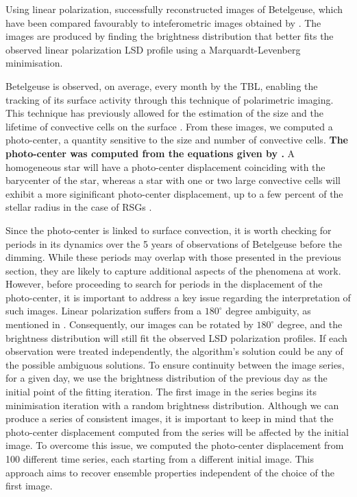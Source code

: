 \documentclass{aa}
\begin{document}
Using linear polarization, \cite{lopez_ariste_convective_2018} successfully reconstructed images of Betelgeuse, which have been compared favourably to inteferometric images obtained by \cite{montarges_close_2016}. The images are produced by finding the brightness distribution that better fits the observed linear 
polarization LSD profile using a Marquardt-Levenberg minimisation.

Betelgeuse is observed, on average, every month by the TBL, enabling the tracking of its surface activity through this technique of polarimetric imaging. This technique has previously allowed for the estimation of  the size and the
 lifetime of convective cells on the surface \citep{lopez_ariste_convective_2018}. From these images, we computed a photo-center, a quantity sensitive to the size and number of convective cells. \textbf{The photo-center was computed from the equations given by \cite{chiavassa_probing_2022}.} 
A homogeneous star will have a photo-center displacement coinciding with the barycenter of the star, whereas a star with one or two large convective cells will exhibit a more siginificant photo-center displacement, up to a few percent of the stellar radius in the case of RSGs \citep{chiavassa_probing_2022}. 

Since the photo-center is linked to surface convection, it is worth checking for periods in its 
dynamics over the 5 years of observations of Betelgeuse before the dimming. While these periods may overlap with those presented in the previous section, they are likely to capture additional aspects of the phenomena at work.
However, before proceeding to search for periods in the displacement of the photo-center, it is important to address a key issue regarding the interpretation of such images. 
Linear polarization suffers from a $180 ^\circ$ degree ambiguity, as mentioned in \cite{auriere_discovery_2016}. Consequently, our images 
can be 
rotated by $180^\circ$ degree, and the brightness distribution will still fit the observed LSD polarization profiles. 
If each observation were treated independently, the algorithm's solution could be any of the possible ambiguous solutions. To ensure continuity 
between the image series, 
for a given day, we use the brightness distribution of the previous day as the initial point 
of the  fitting iteration. The first image in the series begins its minimisation iteration with a random brightness distribution. 
Although we can produce a series of consistent images, it is important to keep in mind that the photo-center displacement computed from the series 
will be affected by the initial image. 
To overcome this issue, we computed
the photo-center displacement from 100 different time series, each starting from a different initial image. This approach aims to recover ensemble properties independent of the choice of the first image. 
\end{document}
